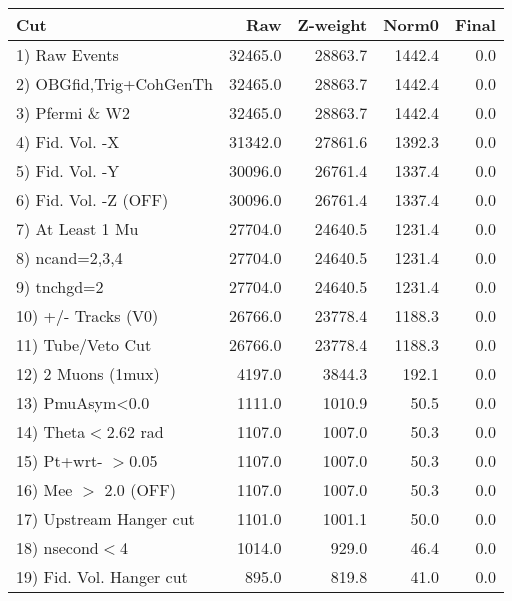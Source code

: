  \begin{table}[h!]\centering
 \begin{tabular}{||l||r|r|r|r||}
 \hline
 \hline
 Cut & Raw & Z-weight & Norm0 & Final \\
 \hline
  1) Raw Events           &     32465.0 &     28863.7 &      1442.4 &         0.0 \\
  2) OBGfid,Trig+CohGenTh &     32465.0 &     28863.7 &      1442.4 &         0.0 \\
  3) Pfermi \& W2         &     32465.0 &     28863.7 &      1442.4 &         0.0 \\
  4) Fid. Vol. -X         &     31342.0 &     27861.6 &      1392.3 &         0.0 \\
  5) Fid. Vol. -Y         &     30096.0 &     26761.4 &      1337.4 &         0.0 \\
  6) Fid. Vol. -Z (OFF)   &     30096.0 &     26761.4 &      1337.4 &         0.0 \\
  7) At Least 1 Mu        &     27704.0 &     24640.5 &      1231.4 &         0.0 \\
  8) ncand=2,3,4          &     27704.0 &     24640.5 &      1231.4 &         0.0 \\
  9) tnchgd=2             &     27704.0 &     24640.5 &      1231.4 &         0.0 \\
 10) +/- Tracks (V0)      &     26766.0 &     23778.4 &      1188.3 &         0.0 \\
 11) Tube/Veto Cut        &     26766.0 &     23778.4 &      1188.3 &         0.0 \\
 12) 2 Muons (1mux)       &      4197.0 &      3844.3 &       192.1 &         0.0 \\
 13) PmuAsym<0.0          &      1111.0 &      1010.9 &        50.5 &         0.0 \\
 14) Theta$<$2.62 rad     &      1107.0 &      1007.0 &        50.3 &         0.0 \\
 15) Pt+wrt- $>$0.05      &      1107.0 &      1007.0 &        50.3 &         0.0 \\
 16) Mee $>$ 2.0  (OFF)   &      1107.0 &      1007.0 &        50.3 &         0.0 \\
 17) Upstream Hanger cut  &      1101.0 &      1001.1 &        50.0 &         0.0 \\
 18) nsecond$<$4          &      1014.0 &       929.0 &        46.4 &         0.0 \\
 19) Fid. Vol. Hanger cut &       895.0 &       819.8 &        41.0 &         0.0 \\

\end{tabular}
\end{table}
